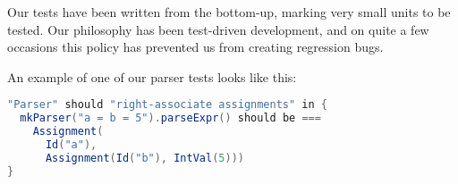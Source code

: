 \documentclass{article}
\begin{document}
Our tests have been written from the bottom-up, marking very small units to be tested. Our philosophy has been
test-driven development, and on quite a few occasions this policy has prevented us from creating regression bugs.

An example of one of our parser tests looks like this:

\begin{lstlisting}[language=Scala]
"Parser" should "right-associate assignments" in {
  mkParser("a = b = 5").parseExpr() should be ===
    Assignment(
      Id("a"),
      Assignment(Id("b"), IntVal(5)))
}
\end{lstlisting}

\testsrc{*}
\end{document}
